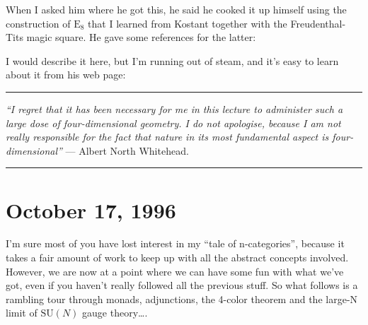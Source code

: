 \documentclass{article}
\def\tightlist{}
\renewcommand{\texttt}[1]{%
  \begingroup
  \ttfamily
  \begingroup\lccode`~=`/\lowercase{\endgroup\def~}{/\discretionary{}{}{}}%
  \begingroup\lccode`~=`[\lowercase{\endgroup\def~}{[\discretionary{}{}{}}%
  \begingroup\lccode`~=`.\lowercase{\endgroup\def~}{.\discretionary{}{}{}}%
  \catcode`/=\active\catcode`[=\active\catcode`.=\active
  \scantokens{#1\noexpand}%
  \endgroup
}
\begin{document}
When I asked him where he got this, he said he cooked it up himself
using the construction of \(\mathrm{E}_8\) that I learned from Kostant
together with the Freudenthal-Tits magic square. He gave some references
for the latter:


I would describe it here, but I'm running out of steam, and it's easy to
learn about it from his web page:


\begin{center}\rule{0.5\linewidth}{0.5pt}\end{center}

\emph{``I regret that it has been necessary for me in this lecture to
administer such a large dose of four-dimensional geometry. I do not
apologise, because I am not really responsible for the fact that nature
in its most fundamental aspect is four-dimensional''} --- Albert North
Whitehead.

\begin{center}\rule{0.5\linewidth}{0.5pt}\end{center}
\hypertarget{week92}{%
\section{October 17, 1996}\label{week92}}

I'm sure most of you have lost interest in my ``tale of n-categories'',
because it takes a fair amount of work to keep up with all the abstract
concepts involved. However, we are now at a point where we can have some
fun with what we've got, even if you haven't really followed all the
previous stuff. So what follows is a rambling tour through monads,
adjunctions, the 4-color theorem and the large-N limit of
\(\mathrm{SU}(N)\) gauge theory\ldots.
\end{document}
